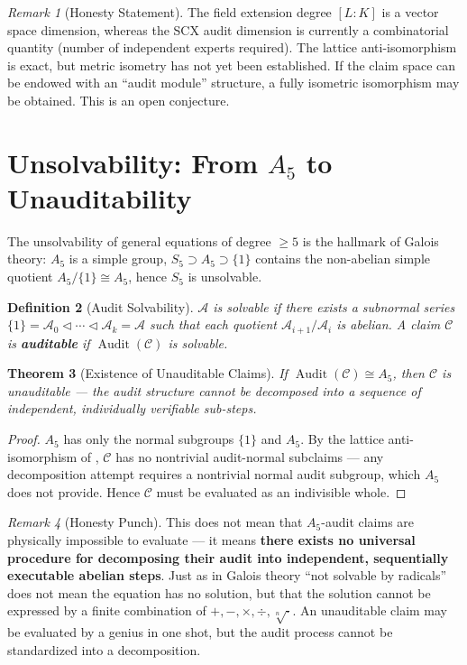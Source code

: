 \documentclass[10pt,a4paper]{article}
\newtheorem{theorem}{Theorem}[section]
\newtheorem{definition}[theorem]{Definition}
\theoremstyle{remark}
\newtheorem{remark}[theorem]{Remark}
\DeclareMathOperator{\Audit}{Audit}
\newcommand{\A}{\mathcal{A}}
\newcommand{\cC}{\mathcal{C}}
\begin{document}
\begin{remark}[Honesty Statement]
The field extension degree $[L:K]$ is a vector space dimension, whereas the SCX audit dimension is currently a combinatorial quantity (number of independent experts required). The lattice anti-isomorphism is exact, but metric isometry has not yet been established. If the claim space can be endowed with an ``audit module'' structure, a fully isometric isomorphism may be obtained. This is an open conjecture.
\end{remark}

\section{Unsolvability: From $A_5$ to Unauditability}

The unsolvability of general equations of degree $\ge 5$ is the hallmark of Galois theory: $A_5$ is a simple group, $S_5\supset A_5\supset\{1\}$ contains the non-abelian simple quotient $A_5/\{1\}\cong A_5$, hence $S_5$ is unsolvable.

\begin{definition}[Audit Solvability]
$\A$ is solvable if there exists a subnormal series $\{1\}=\A_0\triangleleft\cdots\triangleleft\A_k=\A$ such that each quotient $\A_{i+1}/\A_i$ is abelian. A claim $\cC$ is \textbf{auditable} if $\Audit(\cC)$ is solvable.
\end{definition}

\begin{theorem}[Existence of Unauditable Claims]\label{thm:unauditable}
If $\Audit(\cC)\cong A_5$, then $\cC$ is unauditable --- the audit structure cannot be decomposed into a sequence of independent, individually verifiable sub-steps.
\end{theorem}

\begin{proof}
$A_5$ has only the normal subgroups $\{1\}$ and $A_5$. By the lattice anti-isomorphism of , $\cC$ has no nontrivial audit-normal subclaims --- any decomposition attempt requires a nontrivial normal audit subgroup, which $A_5$ does not provide. Hence $\cC$ must be evaluated as an indivisible whole.
\end{proof}

\begin{remark}[Honesty Punch]
This does not mean that $A_5$-audit claims are physically impossible to evaluate --- it means \textbf{there exists no universal procedure for decomposing their audit into independent, sequentially executable abelian steps}. Just as in Galois theory ``not solvable by radicals'' does not mean the equation has no solution, but that the solution cannot be expressed by a finite combination of $+,-,\times,\div,\sqrt[n]{\cdot}$. An unauditable claim may be evaluated by a genius in one shot, but the audit process cannot be standardized into a decomposition.
\end{remark}
\end{document}
